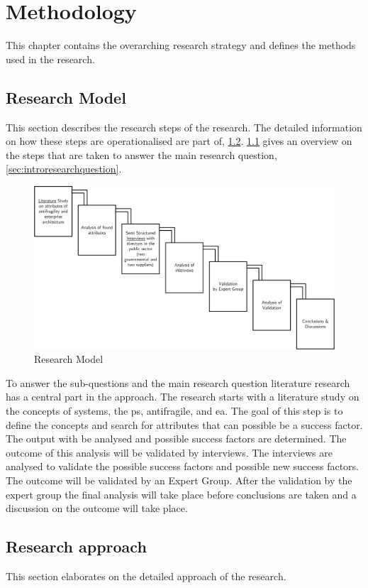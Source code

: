 \chapter{Methodology}
\label{ch:methodology}
This chapter contains the overarching research strategy and defines the methods used in the research.
\section{Research Model}
\label{sec:researchmodel}
This section describes the research steps of the research. The detailed information on how these steps are operationalised are part of, \cref{sec:researchapproach}. \cref{fig:research-model} gives an overview on the steps that are taken to answer the main research question, \cref{sec:introresearchquestion}.
	\begin{figure}[H]
		\centering
		\includegraphics[width=14cm]{images/researchmodel}
		\caption[Research Model]{Research Model}
		\label{fig:research-model}
	\end{figure}
To answer the sub-questions and the main research question literature research has a central part in the approach. The research starts with a literature study on the concepts of systems, the \gls{ps}, \gls{antifragile}, and \acrfull{ea}. The goal of this step is to define the concepts and search for attributes that can possible be a success factor. The output with be analysed and possible success factors are determined. The outcome of this analysis will be validated by interviews. The interviews are analysed to validate the possible success factors and possible new success factors. The outcome will be validated by an Expert Group. After the validation by the expert group the final analysis will take place before conclusions are taken and a discussion on the outcome will take place.
\section{Research approach}
\label{sec:researchapproach}
This section elaborates on the detailed approach of the research.
